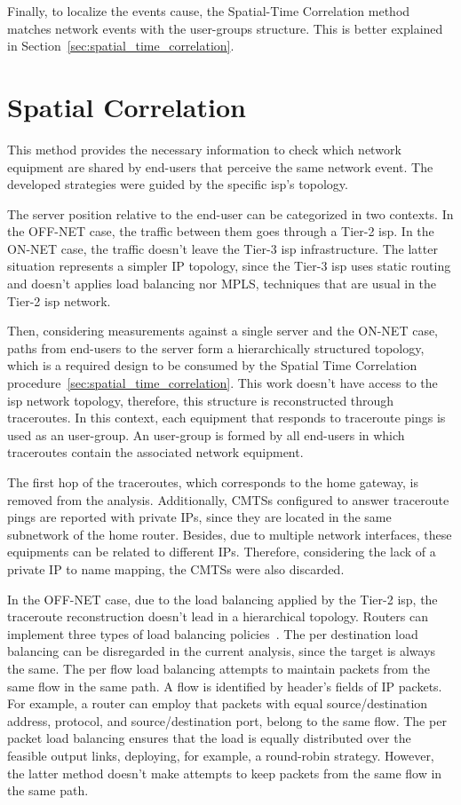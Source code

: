 Finally, to localize the events cause, the Spatial-Time Correlation method
matches network events with the user-groups structure.
This is better explained in Section~\ref{sec:spatial_time_correlation}.

\section{Spatial Correlation}
\label{sec:spatial_correlation}

This method provides the necessary information to check which network equipment
are shared by end-users that perceive the same network event.
The developed strategies were guided by the specific \gls*{isp}'s topology.

The server position relative to the end-user
can be categorized in two contexts.
In the OFF-NET case, the traffic between them
goes through a Tier-2 \gls*{isp}\@.
In the ON-NET case, the traffic
doesn't leave the Tier-3 \gls*{isp} infrastructure.
The latter situation represents a simpler IP topology, since the Tier-3 \gls*{isp}
uses static routing and
doesn't applies load balancing nor MPLS, techniques that are usual in the Tier-2
\gls*{isp} network.

Then, considering measurements against a single server and the ON-NET
case, paths from end-users to the server form a hierarchically
structured topology, which is a required design to be consumed by the
Spatial Time Correlation procedure~\ref{sec:spatial_time_correlation}.
This work doesn't have access to the \gls*{isp} network
topology, therefore, this structure is reconstructed through traceroutes.
In this context, each equipment that responds to traceroute
pings is used as an user-group.
An user-group is formed by all end-users in which traceroutes contain the
associated network equipment.

The first hop of the traceroutes, which corresponds to the home gateway, is
removed from the analysis.
Additionally, CMTSs configured to answer traceroute pings are reported
with private IPs,
since they are located in the same subnetwork of the home router.
Besides, due to multiple network interfaces, these equipments can be related
to different IPs.
Therefore, considering the lack of a private IP to name mapping, the CMTSs
were also discarded.

In the OFF-NET case, due to the load balancing applied by the Tier-2 \gls*{isp},
the traceroute reconstruction doesn't lead in a hierarchical topology.
Routers can implement three types of load balancing
policies~\cite{avoiding_traceroute_anomalies_with_paris_traceroute}.
The per
destination load balancing can be disregarded in the current analysis, since
the target is always the same. The per flow load balancing attempts to
maintain packets from the same flow in the same path. A flow is identified
by header's fields of IP packets. For example, a
router can employ that packets with equal source/destination
address, protocol, and source/destination port,
belong to the same flow. The per packet load
balancing ensures that the load is equally distributed over the feasible output
links, deploying, for example, a round-robin strategy. However, the latter
method doesn't
make attempts to keep packets from the same flow in the same path.

